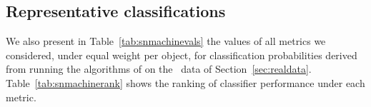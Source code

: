 

\subsection{Representative classifications}
\label{sec:realresults}

We also present in Table~\ref{tab:snmachinevals} the values of all metrics we considered, under equal weight per object, for classification probabilities derived from running the algorithms of \citet{lochner_photometric_2016} on the \snphotcc\ data of Section~\ref{sec:realdata}.
Table~\ref{tab:snmachinerank} shows the ranking of classifier performance under each metric.

